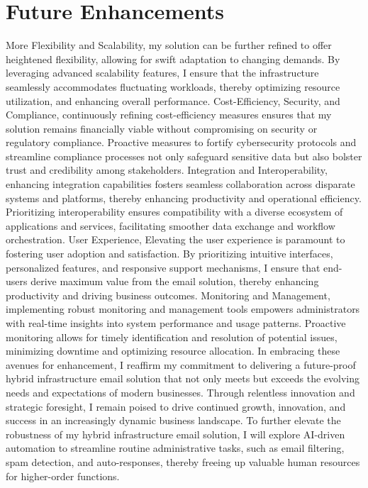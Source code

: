 \section{Future Enhancements}
More Flexibility and Scalability, my solution can be further refined to offer heightened flexibility, allowing for swift adaptation to changing demands. By leveraging advanced scalability features, I ensure that the infrastructure seamlessly accommodates fluctuating workloads, thereby optimizing resource utilization, and enhancing overall performance.
Cost-Efficiency, Security, and Compliance, continuously refining cost-efficiency measures ensures that my solution remains financially viable without compromising on security or regulatory compliance. Proactive measures to fortify cybersecurity protocols and streamline compliance processes not only safeguard sensitive data but also bolster trust and credibility among stakeholders.
Integration and Interoperability, enhancing integration capabilities fosters seamless collaboration across disparate systems and platforms, thereby enhancing productivity and operational efficiency. Prioritizing interoperability ensures compatibility with a diverse ecosystem of applications and services, facilitating smoother data exchange and workflow orchestration.
User Experience, Elevating the user experience is paramount to fostering user adoption and satisfaction. By prioritizing intuitive interfaces, personalized features, and responsive support mechanisms, I ensure that end-users derive maximum value from the email solution, thereby enhancing productivity and driving business outcomes.
Monitoring and Management, implementing robust monitoring and management tools empowers administrators with real-time insights into system performance and usage patterns. Proactive monitoring allows for timely identification and resolution of potential issues, minimizing downtime and optimizing resource allocation.
In embracing these avenues for enhancement, I reaffirm my commitment to delivering a future-proof hybrid infrastructure email solution that not only meets but exceeds the evolving needs and expectations of modern businesses. Through relentless innovation and strategic foresight, I remain poised to drive continued growth, innovation, and success in an increasingly dynamic business landscape. To further elevate the robustness of my hybrid infrastructure email solution, I will explore AI-driven automation to streamline routine administrative tasks, such as email filtering, spam detection, and auto-responses, thereby freeing up valuable human resources for higher-order functions.
